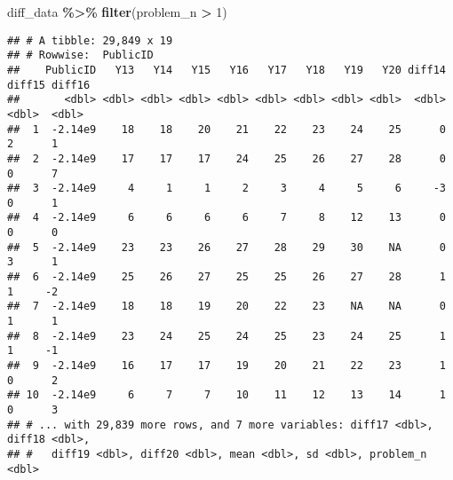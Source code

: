 \documentclass[
]{article}
\newenvironment{Shaded}{\begin{snugshade}}{\end{snugshade}}
\newcommand{\DecValTok}[1]{\textcolor[rgb]{0.00,0.00,0.81}{#1}}
\newcommand{\KeywordTok}[1]{\textcolor[rgb]{0.13,0.29,0.53}{\textbf{#1}}}
\newcommand{\NormalTok}[1]{#1}
\newcommand{\OperatorTok}[1]{\textcolor[rgb]{0.81,0.36,0.00}{\textbf{#1}}}
\newcommand{\StringTok}[1]{\textcolor[rgb]{0.31,0.60,0.02}{#1}}
\begin{document}
\begin{Shaded}
\begin{Highlighting}[]
\NormalTok{diff\_data }\OperatorTok{\%\textgreater{}\%}\StringTok{ }\KeywordTok{filter}\NormalTok{(problem\_n }\OperatorTok{\textgreater{}}\StringTok{ }\DecValTok{1}\NormalTok{)}
\end{Highlighting}
\end{Shaded}

\begin{verbatim}
## # A tibble: 29,849 x 19
## # Rowwise:  PublicID
##    PublicID   Y13   Y14   Y15   Y16   Y17   Y18   Y19   Y20 diff14 diff15 diff16
##       <dbl> <dbl> <dbl> <dbl> <dbl> <dbl> <dbl> <dbl> <dbl>  <dbl>  <dbl>  <dbl>
##  1  -2.14e9    18    18    20    21    22    23    24    25      0      2      1
##  2  -2.14e9    17    17    17    24    25    26    27    28      0      0      7
##  3  -2.14e9     4     1     1     2     3     4     5     6     -3      0      1
##  4  -2.14e9     6     6     6     6     7     8    12    13      0      0      0
##  5  -2.14e9    23    23    26    27    28    29    30    NA      0      3      1
##  6  -2.14e9    25    26    27    25    25    26    27    28      1      1     -2
##  7  -2.14e9    18    18    19    20    22    23    NA    NA      0      1      1
##  8  -2.14e9    23    24    25    24    25    23    24    25      1      1     -1
##  9  -2.14e9    16    17    17    19    20    21    22    23      1      0      2
## 10  -2.14e9     6     7     7    10    11    12    13    14      1      0      3
## # ... with 29,839 more rows, and 7 more variables: diff17 <dbl>, diff18 <dbl>,
## #   diff19 <dbl>, diff20 <dbl>, mean <dbl>, sd <dbl>, problem_n <dbl>
\end{verbatim}
\end{document}
